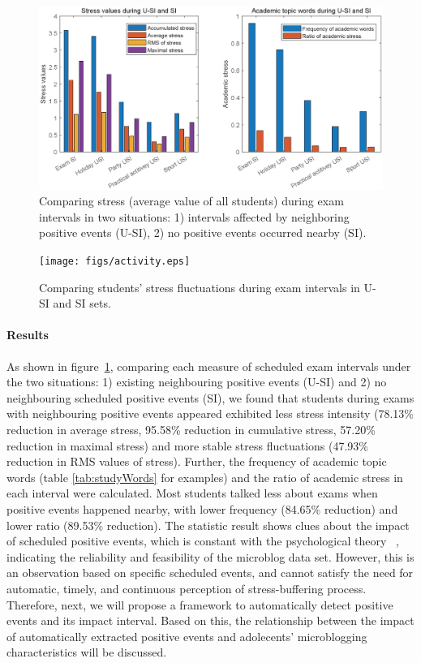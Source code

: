 \begin{figure}[h]
\centering
\includegraphics[width=\linewidth]{figs/barUSI.eps}
\caption{\small{Comparing stress (average value of all students) during exam intervals in two situations:
1) intervals affected by neighboring positive events (U-SI), 2) no positive events occurred nearby (SI).}}
\label{fig:frequencyBar}
\end{figure}

\begin{figure}[h]
\centering
\texttt{[image: figs/activity.eps]}
\caption{\small{Comparing students' stress fluctuations during exam intervals in U-SI and SI sets.}}
\label{fig:frequency}
\end{figure}

\paragraph{Results}
As shown in figure~\ref{fig:frequencyBar},
comparing each measure of scheduled exam intervals under the two situations:
1) existing neighbouring positive events (U-SI) and 2) no neighbouring scheduled positive events (SI),
we found that students during exams with neighbouring positive events appeared exhibited less stress intensity
(78.13\% reduction in average stress, 95.58\%  reduction in cumulative stress, 57.20\%  reduction in maximal stress)
and more stable stress fluctuations (47.93\% reduction in RMS values of stress).
Further, the frequency of academic topic words (table \ref{tab:studyWords} for examples)
and the ratio of academic stress in each interval were calculated.
Most students talked less about exams when positive events happened nearby,
with lower frequency (84.65\% reduction) and lower ratio (89.53\% reduction).
The statistic result shows clues about the impact of scheduled positive events,
which is constant with the psychological theory ~\citep{Cohen1984Positive, Cohen2010Positive, Needles1990Positive},
indicating the reliability and feasibility of the microblog data set.
However,
this is an observation based on specific scheduled events,
and cannot satisfy the need for automatic, timely, and continuous perception of stress-buffering process.
Therefore, next, we will propose a framework to automatically detect positive events and its impact interval.
Based on this,
the relationship between the impact of automatically extracted positive events
and adolecents' microblogging characteristics will be discussed.



